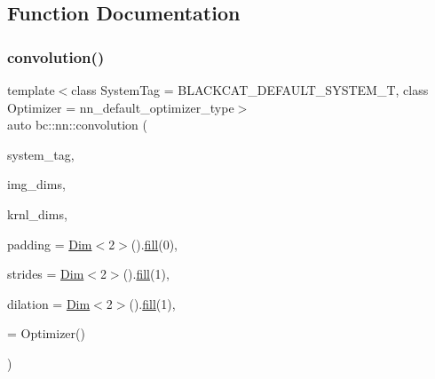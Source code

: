 \subsection{Function Documentation}
\mbox{\label{namespacebc_1_1nn_a52abc08f24905dc8029f3a913bdd07e1}} 
\subsubsection{\texorpdfstring{convolution()}{convolution()}\hspace{0.1cm}{\footnotesize\ttfamily [1/2]}}
{\footnotesize\ttfamily template$<$class System\+Tag  = B\+L\+A\+C\+K\+C\+A\+T\+\_\+\+D\+E\+F\+A\+U\+L\+T\+\_\+\+S\+Y\+S\+T\+E\+M\+\_\+T, class Optimizer  = nn\+\_\+default\+\_\+optimizer\+\_\+type$>$ \\
auto bc\+::nn\+::convolution (\begin{DoxyParamCaption}\item[{System\+Tag}]{system\+\_\+tag,  }\item[{\hyperlink{structbc_1_1Dim}{Dim}$<$ 3 $>$}]{img\+\_\+dims,  }\item[{\hyperlink{structbc_1_1Dim}{Dim}$<$ 3 $>$}]{krnl\+\_\+dims,  }\item[{\hyperlink{structbc_1_1Dim}{Dim}$<$ 2 $>$}]{padding = {\ttfamily \hyperlink{structbc_1_1Dim}{Dim}$<$2$>$().\hyperlink{tensor__iteralgos_8h_afd10a40f252abd24d1faa2752becdd53}{fill}(0)},  }\item[{\hyperlink{structbc_1_1Dim}{Dim}$<$ 2 $>$}]{strides = {\ttfamily \hyperlink{structbc_1_1Dim}{Dim}$<$2$>$().\hyperlink{tensor__iteralgos_8h_afd10a40f252abd24d1faa2752becdd53}{fill}(1)},  }\item[{\hyperlink{structbc_1_1Dim}{Dim}$<$ 2 $>$}]{dilation = {\ttfamily \hyperlink{structbc_1_1Dim}{Dim}$<$2$>$().\hyperlink{tensor__iteralgos_8h_afd10a40f252abd24d1faa2752becdd53}{fill}(1)},  }\item[{Optimizer}]{ = {\ttfamily Optimizer()} }\end{DoxyParamCaption})}

\mbox{\label{namespacebc_1_1nn_a4029ec07d94f518e19c06c5bea63bd17}} 

